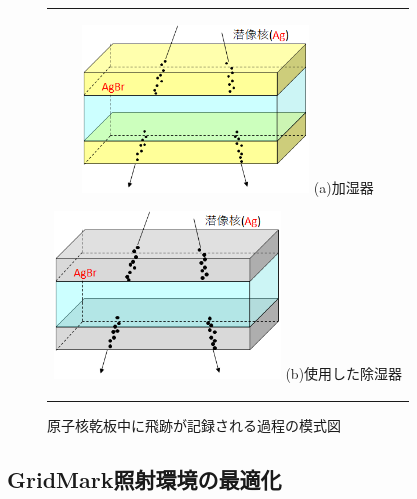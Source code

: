 \documentclass[12pt,a4paper]{jarticle}
\begin{document}
\begin{figure}[htbp]
  \centering
      \begin{tabular}{c}
        \begin{minipage}{0.5\hsize}
          \centering
            \includegraphics[clip, width=60mm]{process_bdev.png}
            \hspace{1.6cm} (a)加湿器
        \end{minipage}
        
        \begin{minipage}{0.5\hsize}
          \centering
            \includegraphics[clip, width=60mm]{process_adev.png}
            \hspace{1.6cm} (b)使用した除湿器
        \end{minipage}
    
      \end{tabular}
      \caption{原子核乾板中に飛跡が記録される過程の模式図\label{fig:refresh_mizumasi-nn}}
\end{figure}
\subsection{GridMark照射環境の最適化}
\end{document}
